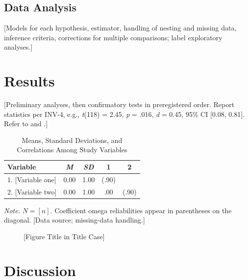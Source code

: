 \documentclass[man,floatsintext]{apa7}
\begin{document}
\subsection{Data Analysis}
[Models for each hypothesis, estimator, handling of nesting and missing data,
inference criteria, corrections for multiple comparisons; label exploratory
analyses.]

\section{Results}
\label{sec:results}
% 

[Preliminary analyses, then confirmatory tests in preregistered order. Report
statistics per INV-4, e.g., \textit{t}(118) = 2.45, \textit{p} = .016,
\textit{d} = 0.45, 95\% CI [0.08, 0.81]. Refer to  and
.]

\begin{table}[tbp]
\begin{threeparttable}
\caption{Means, Standard Deviations, and Correlations Among Study Variables}
\label{tab:descriptives}
% 
\begin{tabular}{lcccc}
\toprule
Variable & \textit{M} & \textit{SD} & 1 & 2 \\
\midrule
1. [Variable one] & 0.00 & 1.00 & (.90) &       \\
2. [Variable two] & 0.00 & 1.00 & .00   & (.90) \\
\bottomrule
\end{tabular}
\begin{tablenotes}
{\small
\textit{Note.} $N = [n]$. Coefficient omega reliabilities appear in parentheses on
the diagonal. [Data source; missing-data handling.]
}
\end{tablenotes}
\end{threeparttable}
\end{table}

\begin{figure}[tbp]
\caption{[Figure Title in Title Case]}
\label{fig:example}
\centering
{}
\end{figure}

\section{Discussion}
\label{sec:discussion}
% 
\end{document}
